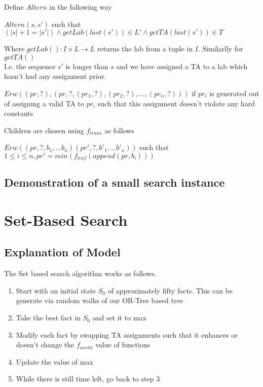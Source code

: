 \documentclass{article}
\begin{document}
Define $Altern$ in the following way 

\begin{center}
  $Altern(s, s')$ such that $(|s| + 1 = |s'|) \land getLab(last(s')) \in
  L' \land getTA(last(s')) \in T$ 
\end{center}

Where $getLab() : I \times L \rightarrow L$ returns the lab from a
tuple in $I$. Similarlly for $getTA()$\\

I.e. the sequence $s'$ is longer than $s$ and we have assigned a TA to a lab
which hasn't had any assignment prior.

\begin{center}
  $Erw((pr, ?), (pr, ?, (pr_1, ?), (pr_2, ?), ... , (pr_n, ?)))$ if $pr_i$
  is generated out of assigning a valid TA to $pr_i$ such that this
  assignment doesn't violate any hard constants
\end{center}


Children are chosen using $f_{trans}$ as follows

\begin{center}
  $Erw((pr, ?, b_1, ... b_n)(pr', ?, b'_1, ... b'_n))$ such that $1
  \leq i \leq n, pr' = min(f_{leaf}(append(pr, b_i)))$
  
\end{center}

\subsection{Demonstration of a small search instance}



\section{Set-Based Search}

\subsection{Explanation of Model}

The Set based search algorithm works as follows.

\begin{enumerate}

\item Start with an initial state $S_0$ of approximately fifty facts.
  This can be generate via random walks of our OR-Tree based tree

\item Take the best fact in $S_0$ and set it to max

\item Modify each fact by swapping TA assignments such that it
  enhances or doesn't change the $f_{werth}$ value of functions

\item Update the value of max

\item While there is still time left, go back to step 3


\end{enumerate}
\end{document}
